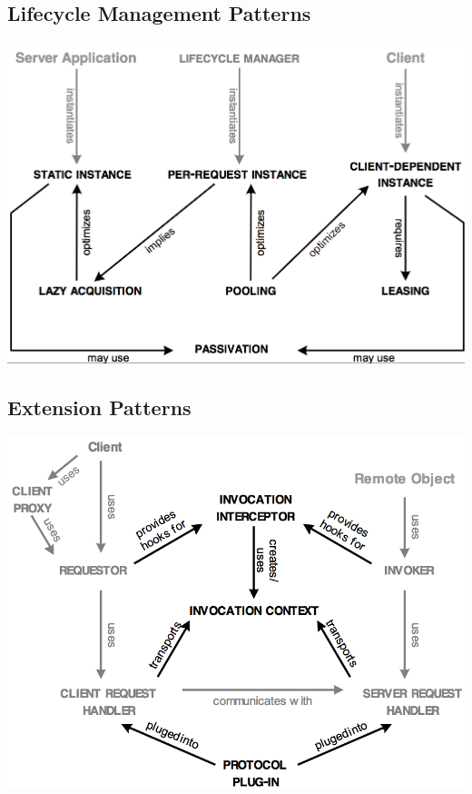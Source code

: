 \documentclass[10pt]{article}
\begin{document}
\subsection{Lifecycle Management Patterns}
\begin{center}
	\includegraphics[scale=0.4]{images/lifecycle-management-pattern.png}
\end{center}
\subsection{Extension Patterns}
\begin{center}
	\includegraphics[scale=0.4]{images/extention-pattern.png}
\end{center}
\end{document}
